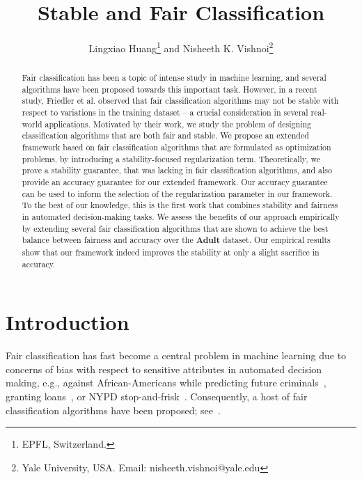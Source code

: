 \documentclass[11pt]{article}
\title{\bf Stable and Fair Classification}
\author{Lingxiao Huang\thanks{EPFL, Switzerland.} and Nisheeth K. Vishnoi\thanks{Yale University, USA. Email: nisheeth.vishnoi@yale.edu}}
\date{}
\begin{document}
	
	\maketitle
	

	\begin{abstract}
		Fair classification has been a topic of intense study in machine learning, and several algorithms have been proposed towards this important task.
		However, in a recent study, Friedler et al. observed that fair classification algorithms may not be  stable  with respect to variations in the training dataset -- a crucial consideration in several real-world applications.
		Motivated by their work, we study the problem of designing classification algorithms that are both fair and stable.
		We propose an extended framework based on fair classification algorithms that are formulated as optimization problems, by introducing a stability-focused regularization term.
		Theoretically, we prove a stability guarantee, that was lacking in fair classification algorithms, and also provide an accuracy guarantee for our extended framework.
		Our accuracy guarantee can be used to inform the selection of the regularization parameter in our framework.
		To the best of our knowledge, this is the first work that combines stability and fairness in automated decision-making tasks.
		We assess the benefits of our approach empirically by extending several fair classification algorithms that are shown to achieve the best balance between fairness and accuracy over the \textbf{Adult} dataset.
		Our empirical results show that our  framework indeed improves the stability at only a slight sacrifice in accuracy.
	\end{abstract}
	\newpage
	
	\tableofcontents

	\newpage
	
		\section{Introduction}
	\label{sec:intro}
	
	
	Fair classification has fast become a central problem in machine learning due to  concerns of bias with respect to  sensitive attributes in automated decision making, e.g., against African-Americans while predicting future criminals~\cite{flores2016false,angwin2016machine,berk2009role}, granting loans~\cite{dedman1988color}, or NYPD stop-and-frisk~\cite{goel2016precinct}.
	Consequently, a host of fair classification algorithms have been proposed; see~\cite{bellamy2018ai}.
	
\end{document}
